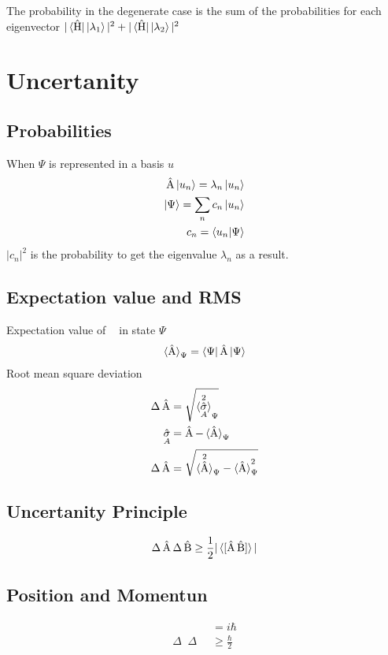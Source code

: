 \documentclass[10pt,a4paper]{book}
\DeclareMathOperator {\opH} {\hat{H}}
\DeclareMathOperator {\opA} {\hat{A}}
\DeclareMathOperator {\opB} {\hat{B}}
\DeclareMathOperator {\opPos} {\hat{x}}
\DeclareMathOperator {\opMom} {\hat{p}}
\DeclareMathOperator {\opSigma} {\hat{\sigma}}
\begin{document}
The probability in the degenerate case is the sum of the probabilities for each eigenvector $| \bra{\opH} \ket{\lambda_1}|^2 + | \bra{\opH} \ket{\lambda_2}|^2$

\chapter{Uncertanity}
\section{Probabilities}
When $\Psi$ is represented in a basis $u$
\begin{align}
	\opA\ket{u_n} = \lambda_n\ket{u_n}\\
	\ket{\Psi} = \sum_{n}c_n\ket{u_n} \\
	c_n = \braket{u_n|\Psi}
\end{align}
$|c_n|^2$ is the probability to get the eigenvalue $\lambda_n$ as a result.
\section{Expectation value and RMS}
Expectation value of $\opA$ in state $\Psi$
\begin{align}
	\braket{\opA}_\Psi = \bra{\Psi}\opA\ket{\Psi}
\end{align}
Root mean square deviation
\begin{align}
	\Delta \opA &= \sqrt{\braket{\opSigma_A^2}_\Psi}\\
	\opSigma_A &= \opA - \braket{\opA}_\Psi \\
	\Delta \opA &= \sqrt{\braket{\opA^2}_\Psi - \braket{\opA}_\Psi^2}
\end{align}
\section{Uncertanity Principle}
\begin{align}
	\Delta\opA\Delta\opB \geq \frac{1}{2}|\braket{[\opA\opB]}|
\end{align}
\section{Position and Momentun}
\begin{align}
	[\opPos,\opMom] &= i\hbar \\
	\Delta\opPos\Delta\opMom &\geq \frac{\hbar}{2}
\end{align}
\end{document}
